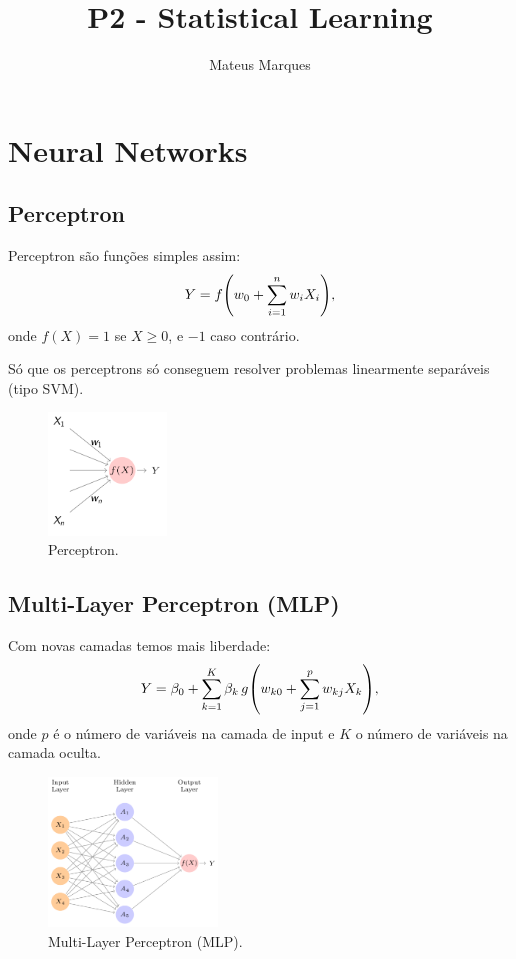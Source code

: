 \documentclass[a4paper,fleqn,12pt]{article}
\title{\Huge{\textbf{P2 - Statistical Learning}}}
\author{Mateus Marques}
\begin{document}
\maketitle

\section{Neural Networks}

\subsection{Perceptron}

Perceptron são funções simples assim:
$$
Y = f\qty(w_0 + \sum_{i=1}^{n} w_i X_i),
$$
onde $f(X) = 1$ se $X \geq 0$, e $-1$ caso contrário.

Só que os perceptrons só conseguem resolver problemas linearmente separáveis (tipo SVM).
\begin{figure}[H]
\centering
\includegraphics[width=0.28\textwidth]{fig/perceptron.png}
\caption{Perceptron.}
\label{fig:perceptron}
\end{figure}

\subsection{Multi-Layer Perceptron (MLP)}

Com novas camadas temos mais liberdade:
$$
Y =  \beta_0 + \sum_{k=1}^{K} \beta_k \, g\qty(w_{k0} + \sum_{j=1}^{p} w_{kj} X_k),
$$
onde $p$ é o número de variáveis na camada de input e $K$ o número de variáveis na camada oculta.
\begin{figure}[H]
\centering
\includegraphics[width=0.4\textwidth]{fig/mlp.png}
\caption{Multi-Layer Perceptron (MLP).}
\label{fig:mlp}
\end{figure}
\end{document}
